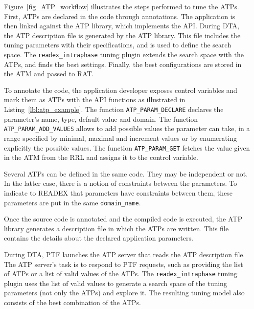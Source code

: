 Figure~\ref{fig_ATP_workflow} illustrates the steps performed to tune the ATPs. First, ATPs are declared in the code through annotations. The application is then linked against the ATP library, which implements the API. During DTA, the ATP description file is generated by the ATP library. This file includes the tuning parameters with their specifications, and is used to define the search space. The \texttt{readex\_intraphase} tuning plugin extends the search space with the ATPs, and finds the best settings. Finally, the best configurations are stored in the ATM and passed to RAT.

To annotate the code, the application developer exposes control variables and mark them as ATPs with the API functions as illustrated in Listing~\ref{lbl:atp_example}. The function \texttt{ATP\_PARAM\_DECLARE} declares the parameter's name, type, default value and domain. The function \texttt{ATP\_PARAM\_ADD\_VALUES} allows to add possible values the parameter can take, in a range specified by minimal, maximal and increment values or by enumerating explicitly the possible values. The function \texttt{ATP\_PARAM\_GET} fetches the value given in the ATM from the RRL and assigns it to the control variable. 

Several ATPs can be defined in the same code. They may be independent or not. In the latter case, there is a notion of constraints between the parameters. To indicate to READEX that parameters have constraints between them, these parameters are put in the same \texttt{domain\_name}.

Once the source code is annotated and the compiled code is executed, the ATP library generates a description file in which the ATPs are written. This file contains the details about the declared application parameters.

During DTA, PTF launches the ATP server that reads the ATP description file. The ATP server's task is to respond to PTF requests, such as providing the list of ATPs or a list of valid values of the ATPs. The \texttt{readex\_intraphase} tuning plugin uses the list of valid values to generate a search space of the tuning parameters (not only the ATPs) and explore it. The resulting tuning model also consists of the best combination of the ATPs.
\newpage


